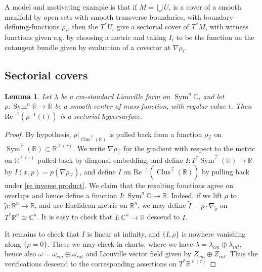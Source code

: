 \documentclass{article}
\def\R{\mathbb{R}}
\def\C{\mathbb{C}}
\def\wt{\widetilde}
\DeclareMathOperator{\Sym}{Sym}
\DeclareMathOperator{\Clus}{Clus}
\renewcommand{\Re}{\mathrm{Re}}
\newtheorem{lemma}[theorem]{Lemma}
\theoremstyle{definition}
\begin{document}
A model and motivating example is that if $M = \bigcup U_i$ is a cover of a smooth manifold by open sets with smooth transverse boundaries, with boundary-defining-functions $\rho_i$, then the $T^* U_i$ give a sectorial cover of $T^*M$, with witness functions given e.g. by choosing a metric and taking $I_i$ to be the function on the cotangent bundle given by evaluation of a covector at $ \nabla \rho_i$.





\subsection{Sectorial covers}




\begin{lemma} \label{lm:sectorial-base-condition}
Let $\lambda$ be a cm-standard Liouville form on $\Sym^n \C$, and let $\rho: \Sym^n \R \to \R$ be a smooth center of mass function, with regular value $t$.  Then $\Re^{-1}(\rho^{-1}(t))$ is a sectorial hypersurface.
\end{lemma}
\begin{proof}
By hypothesis, $\rho|_{\Clus^{\vec\tau}(\R)}$ is pulled back from a function $\rho_{\vec \tau}$ on $\Sym^{\vec \tau}(\R) \subset \R^{\ell(\tau)}$.  We write $\nabla \rho_{\vec \tau}$ for the gradient with respect to the metric on $\R^{\ell(\tau)}$ pulled back by diagonal embedding, and define
$I: T^* \Sym^{\vec \tau}(\R) \to \R$ by 
$I(x, p) = p(\nabla \rho_{\vec \tau})$, and define $I$ on $\Re^{-1}(\Clus^{\vec \tau}(\R))$ by pulling back under \eqref{re inverse product}.  We claim that the resulting functions agree on overlaps and hence define a function $I: \Sym^n \C \to \R$.   Indeed, if we lift $\rho$ to $\wt \rho: \R^n \to \R$, and use Euclidean metric on $\R^n$, we may define $\wt I = p \cdot \nabla_{\wt \rho}$ on $T^*\R^n \cong \C^n$. It is easy to check that $\wt I: \C^n \to \R$ descend to $I$.



It remains to check that $I$ is linear at infinity, and $\{I, \rho\}$ is nowhere vanishing along $\{\rho = 0\}$.  
These we may check in charts, where we have $\lambda = \lambda_{cm} \oplus \lambda_{int}$, hence also $\omega = \omega_{cm} \oplus \omega_{int}$ and Liouville vector field given by $Z_{cm} \oplus Z_{int}$.  Thus the verifications descend to the corresponding assertions on $T^* \R^{\ell(\tau)}$ 
\end{proof}
\end{document}
